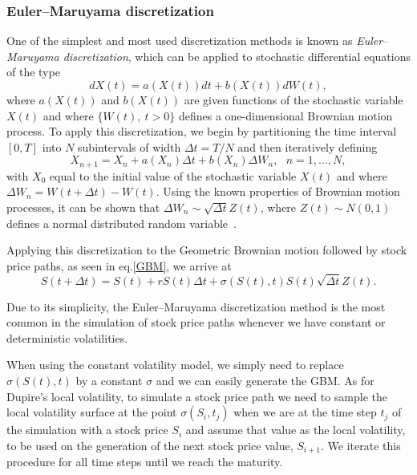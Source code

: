 \subsubsection{Euler–Maruyama discretization}
\label{subsubsection:EulerMaruyama discretization}
One of the simplest and most used discretization methods is known as \emph{Euler–Maruyama discretization}, which can be applied to stochastic differential equations of the type
\begin{equation}\label{SDE}
dX(t)=a(X(t))dt+b(X(t))dW(t),
\end{equation}
\noindent where $a(X(t))$ and $b(X(t))$ are given functions of the stochastic variable $X(t)$ and where $\{W(t),\ t>0\}$ defines a one-dimensional Brownian motion process.
To apply this discretization, we begin by partitioning the time interval $[0,T]$ into $N$ subintervals of width $\Delta t=T/N$ and then iteratively defining
\begin{equation}
X_{n+1}=X_n+a(X_n)\Delta t+b(X_n)\Delta W_n,\ \ \ n=1,\ldots,N,
\end{equation}
\noindent with $X_{0}$ equal to the initial value of the stochastic variable $X(t)$ and where $\Delta W_n=W(t+\Delta t)-W(t)$.
Using the known properties of Brownian motion processes, it can be shown that $\Delta W_n\sim \sqrt{\Delta t}Z(t)$, where $Z(t)\sim N(0,1)$ defines a normal distributed random variable~\citep{Mikosch}.

Applying this discretization to the Geometric Brownian motion followed by stock price paths, as seen in eq.\eqref{GBM}, we arrive at
\begin{equation}
S(t+\Delta t)=S(t)+rS(t)\Delta t+\sigma(S(t),t)S(t)\sqrt{\Delta t}Z(t).
\end{equation}

Due to its simplicity, the Euler–Maruyama discretization method is the most common in the simulation of stock price paths whenever we have constant or deterministic volatilities.

When using the constant volatility model, we simply need to replace $\sigma(S(t),t)$ by a constant $\sigma$ and we can easily generate the GBM.
As for Dupire's local volatility, to simulate a stock price path we need to sample the local volatility surface at the point $\sigma(S_i,t_j)$ when we are at the time step $t_j$ of the simulation with a stock price $S_i$ and assume that value as the local volatility, to be used on the generation of the next stock price value, $S_{i+1}$. We iterate this procedure for all time steps until we reach the maturity.




